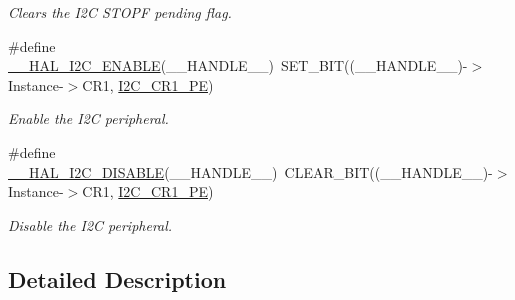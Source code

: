 \begin{DoxyCompactItemize}
\begin{DoxyCompactList}\small\item\em Clears the I2\-C S\-T\-O\-P\-F pending flag. \end{DoxyCompactList}\item 
\#define \hyperlink{group___i2_c___exported___macros_gacff412c47b0c1d63ef3b2a07f65988b7}{\-\_\-\-\_\-\-H\-A\-L\-\_\-\-I2\-C\-\_\-\-E\-N\-A\-B\-L\-E}(\-\_\-\-\_\-\-H\-A\-N\-D\-L\-E\-\_\-\-\_\-)~S\-E\-T\-\_\-\-B\-I\-T((\-\_\-\-\_\-\-H\-A\-N\-D\-L\-E\-\_\-\-\_\-)-\/$>$Instance-\/$>$C\-R1, \hyperlink{group___peripheral___registers___bits___definition_ga953b0d38414808db79da116842ed3262}{I2\-C\-\_\-\-C\-R1\-\_\-\-P\-E})
\begin{DoxyCompactList}\small\item\em Enable the I2\-C peripheral. \end{DoxyCompactList}\item 
\#define \hyperlink{group___i2_c___exported___macros_ga3d6a35da02ca72537a15570912c80412}{\-\_\-\-\_\-\-H\-A\-L\-\_\-\-I2\-C\-\_\-\-D\-I\-S\-A\-B\-L\-E}(\-\_\-\-\_\-\-H\-A\-N\-D\-L\-E\-\_\-\-\_\-)~C\-L\-E\-A\-R\-\_\-\-B\-I\-T((\-\_\-\-\_\-\-H\-A\-N\-D\-L\-E\-\_\-\-\_\-)-\/$>$Instance-\/$>$C\-R1, \hyperlink{group___peripheral___registers___bits___definition_ga953b0d38414808db79da116842ed3262}{I2\-C\-\_\-\-C\-R1\-\_\-\-P\-E})
\begin{DoxyCompactList}\small\item\em Disable the I2\-C peripheral. \end{DoxyCompactList}\end{DoxyCompactItemize}


\subsection{Detailed Description}


